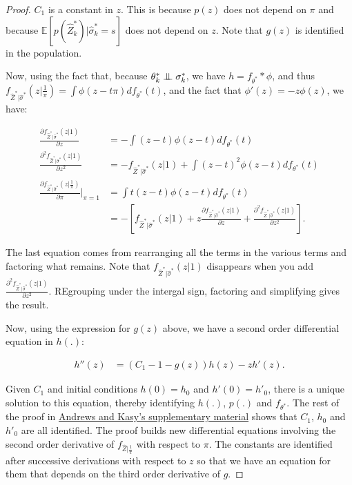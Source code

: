 \documentclass[
]{book}
\newcommand{\esp}[1]{\mathbb{E}[ #1 ]}
\newcommand\Ind{\protect\mathpalette{\protect\independenT}{\perp}}
\def\independenT#1#2{\mathrel{\setbox0\hbox{$#1#2$}\copy0\kern-\wd0\mkern4mu\box0}}
\newcommand{\partder}[2]{\frac{\partial #1}{\partial #2}}
\newcommand{\partdersq}[2]{\frac{\partial^2 #1}{\partial #2^2}}
\theoremstyle{definition}
\theoremstyle{definition}
\theoremstyle{definition}
\theoremstyle{definition}
\theoremstyle{remark}
\begin{document}
\begin{proof}
\(C_1\) is a constant in \(z\).
This is because \(p(z)\) does not depend on \(\pi\) and because \(\esp{p(\hat{Z}^*_k)|\hat{\sigma}_k^*=s}\) does not depend on \(z\).
Note that \(g(z)\) is identified in the population.

Now, using the fact that, because \(\theta^*_k\Ind\sigma^*_k\), we have \(h=f_{\theta^*}*\phi\), and thus \(f_{\hat{Z}^*|\hat{\sigma}^*}(z|\frac{1}{\pi})=\int\phi(z-t\pi)df_{\theta^*}(t)\), and the fact that \(\phi'(z)=-z\phi(z)\), we have:

\begin{align*}
  \partder{f_{\hat{Z}^*|\hat{\sigma}^*}(z|1)}{z} & = -\int(z-t)\phi(z-t)df_{\theta^*}(t)\\
   \partdersq{f_{\hat{Z}^*|\hat{\sigma}^*}(z|1)}{z} & = - f_{\hat{Z}^*|\hat{\sigma}^*}(z|1) +\int(z-t)^2\phi(z-t)df_{\theta^*}(t)\\
   \partder{f_{\hat{Z}^*|\hat{\sigma}^*}(z|\frac{1}{\pi})}{\pi}|_{\pi=1} & = \int t(z-t)\phi(z-t)df_{\theta^*}(t)\\
            & = - \left[f_{\hat{Z}^*|\hat{\sigma}^*}(z|1)+z\partder{f_{\hat{Z}^*|\hat{\sigma}^*}(z|1)}{z} + \partdersq{f_{\hat{Z}^*|\hat{\sigma}^*}(z|1)}{z}\right].
\end{align*}

The last equation comes from rearranging all the terms in the various terms and factoring what remains.
Note that \(f_{\hat{Z}^*|\hat{\sigma}^*}(z|1)\) disappears when you add \(\partdersq{f_{\hat{Z}^*|\hat{\sigma}^*}(z|1)}{z}\).
REgrouping under the intergal sign, factoring and simplifying gives the result.

Now, using the expression for \(g(z)\) above, we have a second order differential equation in \(h(.)\):

\begin{align*}
  h''(z) & = (C_1-1-g(z))h(z)-zh'(z).
\end{align*}

Given \(C_1\) and initial conditions \(h(0)=h_0\) and \(h'(0)=h'_0\), there is a unique solution to this equation, thereby identifying \(h(.)\), \(p(.)\) and \(f_{\theta^*}\).
The rest of the proof in \href{https://www.aeaweb.org/content/file?id=10286}{Andrews and Kasy's supplementary material} shows that \(C_1\), \(h_0\) and \(h'_0\) are all identified.
The proof builds new differential equations involving the second order derivative of \(f_{\hat{Z}|\frac{1}{\pi}}\) with respect to \(\pi\).
The constants are identified after successive derivations with respect to \(z\) so that we have an equation for them that depends on the third order derivative of \(g\).
\end{proof}
\end{document}
